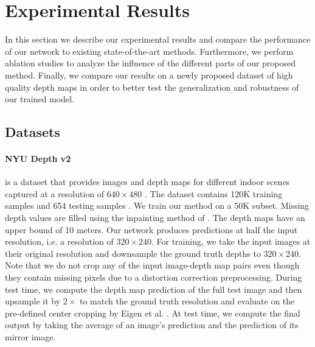\documentclass[10pt,twocolumn,letterpaper]{article}
\begin{document}
\section{Experimental Results}

In this section we describe our experimental results and compare the performance of our network to existing state-of-the-art methods. Furthermore, we perform ablation studies to analyze the influence of the different parts of our proposed method. Finally, we compare our results on a newly proposed dataset of high quality depth maps in order to better test the generalization and robustness of our trained model.

\subsection{Datasets}

\paragraph{NYU Depth v2} is a dataset that provides images and depth maps for different indoor scenes captured at a resolution of $640\times480$ \cite{Silberman2012}. The dataset contains 120K training samples and 654 testing samples \cite{Eigen2014}. We train our method on a 50K subset. Missing depth values are filled using the inpainting method of \cite{Levin2004}. The depth maps have an upper bound of 10 meters. Our network produces predictions at half the input resolution, i.e. a resolution of $320\times240$. For training, we take the input images at their original resolution and downsample the ground truth depths to $320\times240$. Note that we do not crop any of the input image-depth map pairs even though they contain missing pixels due to a distortion correction preprocessing. During test time, we compute the depth map prediction of the full test image and then upsample it by $2\times$ to match the ground truth resolution and evaluate on the pre-defined center cropping by Eigen et al. \cite{Eigen2014}. At test time, we compute the final output by taking the average of an image's prediction and the prediction of its mirror image.
\end{document}
